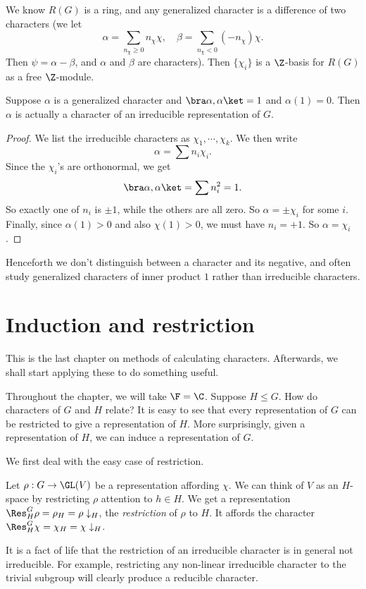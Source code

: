 \documentclass[a4paper]{article}
\begin{document}
We know $R(G)$ is a ring, and any generalized character is a difference of two characters (we let
\[
  \alpha = \sum_{n_\chi \geq 0} n_\chi \chi,\quad \beta = \sum_{n_\chi < 0}(-n_\chi) \chi.
\]
Then $\psi = \alpha - \beta$, and $\alpha$ and $\beta$ are characters). Then $\{\chi_i\}$ is a $\Z$-basis for $R(G)$ as a free $\Z$-module.

\begin{lemma}
  Suppose $\alpha$ is a generalized character and $\bra \alpha, \alpha\ket = 1$ and $\alpha (1) =0$. Then $\alpha$ is actually a character of an irreducible representation of $G$.
\end{lemma}

\begin{proof}
  We list the irreducible characters as $\chi_1, \cdots, \chi_k$. We then write
  \[
    \alpha = \sum n_i \chi_i.
  \]
  Since the $\chi_i$'s are orthonormal, we get
  \[
    \bra \alpha, \alpha\ket = \sum n_i^2 = 1.
  \]
  So exactly one of $n_i$ is $\pm 1$, while the others are all zero. So $\alpha = \pm \chi_i$ for some $i$. Finally, since $\alpha(1) > 0$ and also $\chi(1) > 0$, we must have $n_i = +1$. So $\alpha = \chi_i$.
\end{proof}
Henceforth we don't distinguish between a character and its negative, and often study generalized characters of inner product $1$ rather than irreducible characters.

\section{Induction and restriction}
This is the last chapter on methods of calculating characters. Afterwards, we shall start applying these to do something useful.

Throughout the chapter, we will take $\F = \C$. Suppose $H \leq G$. How do characters of $G$ and $H$ relate? It is easy to see that every representation of $G$ can be restricted to give a representation of $H$. More surprisingly, given a representation of $H$, we can induce a representation of $G$.

We first deal with the easy case of restriction.
\begin{defi}[Restriction]
  Let $\rho: G \to \GL(V)$ be a representation affording $\chi$. We can think of $V$ as an $H$-space by restricting $\rho$ attention to $h \in H$. We get a representation $\Res^G_H \rho = \rho_H = \rho\downarrow_H$, the \emph{restriction} of $\rho$ to $H$. It affords the character $\Res^G_H \chi = \chi_H = \chi\downarrow_H$.
\end{defi}
It is a fact of life that the restriction of an irreducible character is in general not irreducible. For example, restricting any non-linear irreducible character to the trivial subgroup will clearly produce a reducible character.
\end{document}
